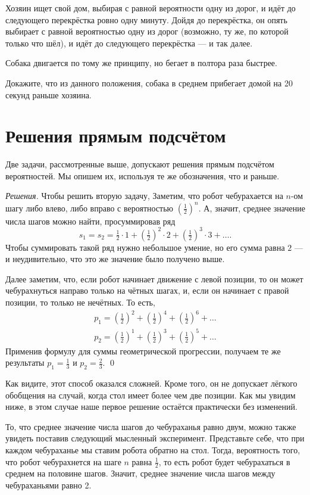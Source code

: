 \documentclass{article}
\begin{document}
Хозяин ищет свой дом, 
выбирая с равной вероятности одну из дорог, 
и идёт до следующего перекрёстка ровно одну минуту.
Дойдя до перекрёстка, он опять выбирает с равной вероятностью 
одну из дорог (возможно, ту же, по которой только что шёл), 
и идёт до следующего перекрёстка --- и так далее.

Собака двигается по тому же принципу, но бегает в полтора раза быстрее.

Докажите, что из данного положения, собака в среднем прибегает домой на 20 секунд раньше хозяина.

\section{Решения прямым подсчётом}

Две задачи, рассмотренные выше, допускают решения прямым подсчётом вероятностей. 
Мы опишем их, используя те же обозначения, что и раньше.

\medskip
\noindent\textit{Решения.}
Чтобы решить вторую задачу, 
Заметим, что робот чебурахается на $n$-ом шагу либо влево, либо вправо с вероятностью $(\tfrac12)^n$.
А, значит, среднее значение числа шагов можно найти, просуммировав ряд
\[s_1=s_2=\tfrac12\cdot1+(\tfrac12)^2\cdot 2+(\tfrac12)^3\cdot 3+\dots.\]
Чтобы суммировать такой ряд нужно небольшое умение, 
но его сумма равна $2$ --- и неудивительно, что это же значение было получено выше.

Далее заметим, что, если робот начинает движение с левой позиции, 
то он может чебурахнуться направо только на чётных шагах, 
и, если он начинает с правой позиции, то только не нечётных.
То есть,
\begin{align*}
p_1=(\tfrac12)^2+(\tfrac12)^4+(\tfrac12)^6+\dots
\\
p_2=(\tfrac12)^1+(\tfrac12)^3+(\tfrac12)^5+\dots
\end{align*}
Применив формулу для суммы геометрической прогрессии, получаем те же результаты $p_1=\tfrac13$ и $p_2=\tfrac23$.
\qed
\medskip

Как видите, этот способ оказался сложней.
Кроме того, он не допускает лёгкого обобщения на случай, когда стол имеет более чем две позиции.
Как мы увидим ниже, в этом случае наше первое решение остаётся практически без изменений.

То, что среднее значение числа шагов до чебураханья
равно двум, можно также увидеть поставив следующий мысленный эксперимент.
Представьте себе, что при каждом чебураханье мы ставим робота обратно на стол.
Тогда, вероятность того, что робот чебурахнется на шаге $n$
равна $\tfrac12$,
то есть робот будет чебурахаться в среднем на половине шагов.
Значит, среднее значение числа шагов между чебураханьями равно 2.
\end{document}
